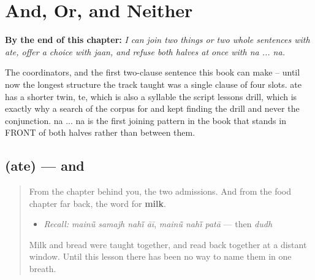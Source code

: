 
\chapter{And, Or, and Neither}
\label{ch:pa-and-or-neither}

\begin{chapteropening}
\textbf{By the end of this chapter:} \emph{I can join two things or two whole sentences with ate, offer a choice with jaan, and refuse both halves at once with na ... na.}

The coordinators, and the first two-clause sentence this book can make -- until now the longest structure the track taught was a single clause of four slots. ate has a shorter twin, te, which is also a syllable the script lessons drill, which is exactly why a search of the corpus for and kept finding the drill and never the conjunction. na ... na is the first joining pattern in the book that stands in FRONT of both halves rather than between them.
\end{chapteropening}

\section[\texorpdfstring{\pa{ਅਤੇ} (ate)}{ਅਤੇ (ate)}]{ (ate) — and}

\label{lesson:PA-C38-ate}



\begin{quote}
From the chapter behind you, the two admissions. And from the food chapter far back, the word for \textbf{milk}.

\begin{itemize}
\raggedright
  \item \emph{Recall:} \emph{mainū̃ samajh nahī̃ āī}, \emph{mainū̃ nahī̃ patā} — then \emph{dudh}
\end{itemize}

Milk and bread were taught together, and read back together at a distant window. Until this lesson there has been no way to name them in one breath.
\end{quote}

